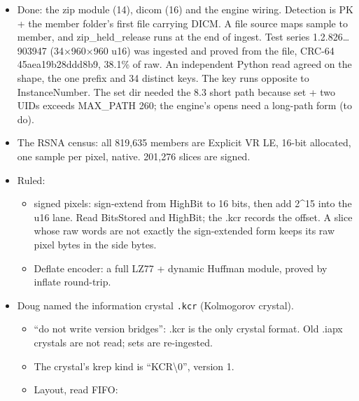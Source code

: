 \begin{itemize}
\begin{enumerate}
\item the zip module (ZIP64 walk moves out of npy.c; module 14);
\item dicom;
\item EngineSideBytes on EngineArrayRead;
\item .kcr v2;
\item one series end to end, then ping RSNA (rsna-knee-abnormality-7d).
\end{enumerate}
\item Done: the zip module (14), dicom (16) and the engine wiring. Detection is PK + the member folder's first file carrying DICM. A file source maps sample to member, and zip\_\allowbreak{}held\_\allowbreak{}release runs at the end of ingest. Test series 1.2.826…903947 (34×960×960 u16) was ingested and proved from the file, CRC-64 45aea19b28ddd8b9, 38.1\% of raw. An independent Python read agreed on the shape, the one prefix and 34 distinct keys. The key runs opposite to InstanceNumber. The set dir needed the 8.3 short path because set + two UIDs exceeds MAX\_\allowbreak{}PATH 260; the engine's opens need a long-path form (to do).
\item The RSNA census: all 819,635 members are Explicit VR LE, 16-bit allocated, one sample per pixel, native. 201,276 slices are signed.
\item Ruled:

\begin{itemize}
\item signed pixels: sign-extend from HighBit to 16 bits, then add 2\textasciicircum{}15 into the u16 lane. Read BitsStored and HighBit; the .kcr records the offset. A slice whose raw words are not exactly the sign-extended form keeps its raw pixel bytes in the side bytes.
\item Deflate encoder: a full LZ77 + dynamic Huffman module, proved by inflate round-trip.
\end{itemize}
\item Doug named the information crystal \texttt{.\allowbreak{}kcr} (Kolmogorov crystal).

\begin{itemize}
\item “do not write version bridges”: .kcr is the only crystal format. Old .iapx crystals are not read; sets are re-ingested.
\item The crystal's krep kind is “KCR\textbackslash{}0”, version 1.
\item Layout, read FIFO:


\end{itemize}
\end{itemize}
